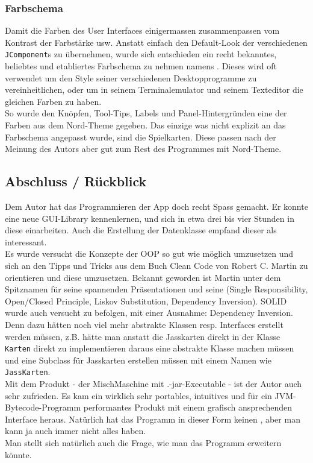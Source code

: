 \documentclass[a4paper,11pt]{article}
\begin{document}
\subsubsection{Farbschema}

Damit die Farben des User Interfaces einigermassen zusammenpassen vom Kontrast der Farbstärke usw. Anstatt einfach den Default-Look der verschiedenen \texttt{JComponent}s zu übernehmen, wurde sich entschieden ein recht bekanntes, beliebtes und etabliertes Farbschema zu nehmen namens . Dieses wird oft verwendet um den Style seiner verschiedenen Desktopprogramme zu vereinheitlichen, oder um in seinem Terminalemulator und seinem Texteditor die gleichen Farben zu haben.\\

So wurde den Knöpfen, Tool-Tips, Labels und Panel-Hintergründen eine der Farben aus dem Nord-Theme gegeben. Das einzige was nicht explizit an das Farbschema angepasst wurde, sind die Spielkarten. Diese passen nach der Meinung des Autors aber gut zum Rest des Programmes mit Nord-Theme.

\subsection{Abschluss / Rückblick}

Dem Autor hat das Programmieren der App doch recht Spass gemacht. Er konnte eine neue GUI-Library kennenlernen, und sich in etwa drei bis vier Stunden in diese einarbeiten. Auch die Erstellung der Datenklasse empfand dieser als interessant.\\

Es wurde versucht die Konzepte der OOP so gut wie möglich umzusetzen und sich an den Tipps und Tricks aus dem Buch Clean Code von Robert C. Martin zu orientieren und diese umzusetzen. Bekannt geworden ist Martin unter dem Spitznamen  für seine spannenden Präsentationen und seine  (Single Responsibility, Open/Closed Principle, Liskov Substitution, Dependency Inversion). SOLID wurde auch versucht zu befolgen, mit einer Ausnahme: Dependency Inversion. Denn dazu hätten noch viel mehr abstrakte Klassen resp. Interfaces erstellt werden müssen, z.B. hätte man anstatt die Jasskarten direkt in der Klasse \texttt{Karten} direkt zu implementieren daraus eine abstrakte Klasse machen müssen und eine Subclass für Jasskarten erstellen müssen mit einem Namen wie \texttt{JassKarten}.\\

Mit dem Produkt - der MischMaschine mit .-jar-Executable - ist der Autor auch sehr zufrieden. Es kam ein wirklich sehr portables, intuitives und für ein JVM-Bytecode-Programm performantes Produkt mit einem grafisch ansprechenden Interface heraus. Natürlich hat das Programm in dieser Form keinen , aber man kann ja auch immer nicht alles haben.\\

Man stellt sich natürlich auch die Frage, wie man das Programm erweitern könnte. 

\end{document}

